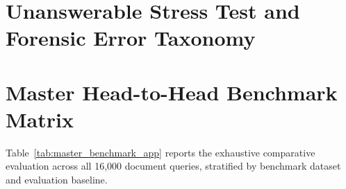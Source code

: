 \documentclass[11pt]{article}
\begin{document}
\section{Unanswerable Stress Test and Forensic Error Taxonomy}
\label{app:stress_test}

\begin{table}[h]
\centering
\small
{}
\vspace{-2mm}
\caption{\textbf{Abstention Stress Test on 1,000 Corrupted Documents.} Percentage of unanswerable queries where models correctly refrain from guessing ($a_{\text{abstain}}$) vs. hallucinating.}
\label{tab:stress_test}
\end{table}






\section{Master Head-to-Head Benchmark Matrix}
\label{app:master_benchmark}

Table~\ref{tab:master_benchmark_app} reports the exhaustive comparative evaluation across all 16,000 document queries, stratified by benchmark dataset and evaluation baseline.
\end{document}
